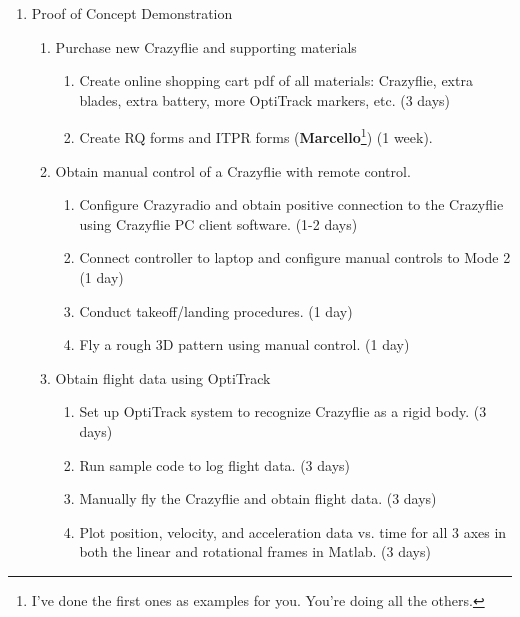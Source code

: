 \documentclass[onecolumn,10pt]{IEEEtran}
\newcommand{\MATLAB}{Matlab}
\begin{document}
\begin{enumerate}
\item Proof of Concept Demonstration
\begin{enumerate}
\item Purchase new Crazyflie and supporting materials
\begin{enumerate}
\item Create online shopping cart pdf of all materials: Crazyflie, extra blades, extra battery, more OptiTrack markers, etc. (3 days)
\item Create RQ forms and ITPR forms (\textbf{Marcello}\footnote{I've done the first ones as examples for you. You're doing all the others.}) (1 week).
\end{enumerate}

\item Obtain manual control of a Crazyflie with remote control.
\begin{enumerate}
\item Configure Crazyradio and obtain positive connection to the Crazyflie using Crazyflie PC client software. (1-2 days)
\item Connect controller to laptop and configure manual controls to Mode 2 (1 day)
\item Conduct takeoff/landing procedures. (1 day)
\item Fly a rough 3D pattern using manual control. (1 day)
\end{enumerate}

\item Obtain flight data using OptiTrack
\begin{enumerate}
\item Set up OptiTrack system to recognize Crazyflie as a rigid body. (3 days)
\item Run sample code to log flight data. (3 days)
\item Manually fly the Crazyflie and obtain flight data. (3 days)
\item Plot position, velocity, and acceleration data vs. time for all 3 axes in both the linear and rotational frames in \MATLAB. (3 days)
\end{enumerate}


\end{enumerate}
\end{enumerate}
\end{document}
